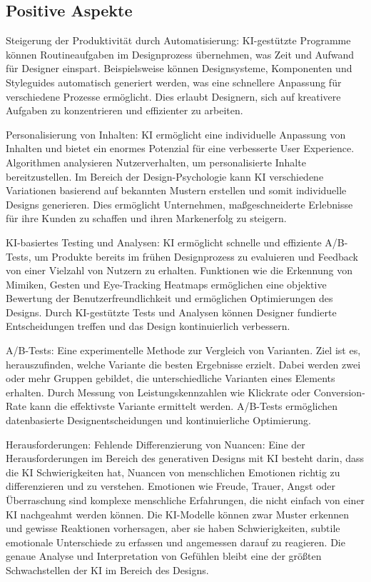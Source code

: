 \subsection*{Positive Aspekte}
Steigerung der Produktivität durch Automatisierung:
KI-gestützte Programme können Routineaufgaben im Designprozess übernehmen, 
was Zeit und Aufwand für Designer einspart. Beispielsweise können Designsysteme, 
Komponenten und Styleguides automatisch generiert werden, was eine schnellere 
Anpassung für verschiedene Prozesse ermöglicht. Dies erlaubt Designern, 
sich auf kreativere Aufgaben zu konzentrieren und effizienter zu arbeiten.

Personalisierung von Inhalten:
KI ermöglicht eine individuelle Anpassung von Inhalten und bietet ein enormes 
Potenzial für eine verbesserte User Experience. Algorithmen analysieren Nutzerverhalten,
um personalisierte Inhalte bereitzustellen. Im Bereich der Design-Psychologie kann KI 
verschiedene Variationen basierend auf bekannten Mustern erstellen und somit 
individuelle Designs generieren. Dies ermöglicht Unternehmen, maßgeschneiderte Erlebnisse 
für ihre Kunden zu schaffen und ihren Markenerfolg zu steigern.

KI-basiertes Testing und Analysen:
KI ermöglicht schnelle und effiziente A/B-Tests, um Produkte bereits im frühen 
Designprozess zu evaluieren und Feedback von einer Vielzahl von Nutzern 
zu erhalten. Funktionen wie die Erkennung von Mimiken, Gesten und Eye-Tracking 
Heatmaps ermöglichen eine objektive Bewertung der Benutzerfreundlichkeit und ermöglichen 
Optimierungen des Designs. Durch KI-gestützte Tests und Analysen können Designer fundierte 
Entscheidungen treffen und das Design kontinuierlich verbessern.

A/B-Tests: Eine experimentelle Methode zur Vergleich von Varianten. Ziel ist es, herauszufinden, welche Variante die besten Ergebnisse erzielt. Dabei werden zwei oder mehr Gruppen gebildet, die unterschiedliche Varianten eines Elements erhalten. Durch Messung von Leistungskennzahlen wie Klickrate oder Conversion-Rate kann die effektivste Variante ermittelt werden. A/B-Tests ermöglichen datenbasierte Designentscheidungen und kontinuierliche Optimierung.

Herausforderungen:
Fehlende Differenzierung von Nuancen:
Eine der Herausforderungen im Bereich des generativen Designs mit KI besteht darin, dass 
die KI Schwierigkeiten hat, Nuancen von menschlichen Emotionen richtig zu differenzieren 
und zu verstehen. Emotionen wie Freude, Trauer, Angst oder Überraschung sind komplexe menschliche 
Erfahrungen, die nicht einfach von einer KI nachgeahmt werden können. Die KI-Modelle können zwar 
Muster erkennen und gewisse Reaktionen vorhersagen, aber sie haben Schwierigkeiten, subtile emotionale 
Unterschiede zu erfassen und angemessen darauf zu reagieren. Die genaue Analyse und Interpretation von 
Gefühlen bleibt eine der größten Schwachstellen der KI im Bereich des Designs.

